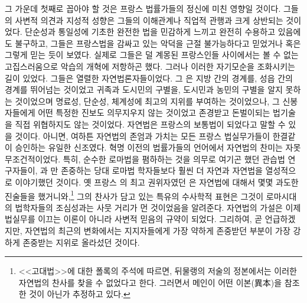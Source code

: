 그 가운데 첫째로 꼽아야 할 것은 프랑스 법률가들의 정신에 미친 영향일 것이다.
그들의 사변적 의견과 지성적 성향은 그들의 이해관계나 직업적 관행과
크게 상반되는 것이었다.
단순성과 통일성에 기초한 완전한 법을 민감하게 느끼고 완전히
수용하고 있음에도 불구하고,
그들은 프랑스법을 감싸고 있는 악덕을 근절 불가능하다고 믿었거나
혹은 그렇게 믿는 듯이 보였다.
실제로 그들은 덜 계몽된 프랑스인들 사이에서는 볼 수 없는 고집스러움으로
악습의 개혁에 저항하곤 했다.
그러나 이러한 자기모순을 조화시키는 길이 있었다.
그들은 열렬한 자연법론자들이었다.
그 은 지방 간의 경계를, 성읍 간의 경계를 뛰어넘는 것이었고
귀족과 도시민의 구별을, 도시민과 농민의 구별을
알지 못하는 것이었으며
명료성, 단순성, 체계성에 최고의 지위를 부여하는 것이었으나,
그 신봉자들에게 어떤 특정한 진보도 의무지우지 않는 것이었고
존경받고 돈벌이되는 법기술을 직접 위협하지도 않는 것이었다.
자연법은 프랑스의 보통법이 되었다고 말할 수 있을 것이다.
아니면, 여하튼 자연법의 존엄과 가치는
모든 프랑스 법실무가들이 한결같이 승인하는 유일한 신조였다.
혁명 이전의 법률가들의 언어에서 자연법의 찬미는 자못 무조건적이었다.
특히,
순수한 로마법을 폄하하는 것을 의무로 여기곤 했던
관습법 연구자들이,
과 만 존중하는 당대 로마법 학자들보다
훨씬 더 자연과 자연법을 열성적으로 이야기했던 것이다.
옛 프랑스 의 최고 권위자였던 은
자연법에 대해서 몇몇 과도한 진술들을 했거니와,\footnote{%
  <<고대법>>에 대한 폴록의 주석에 따르면,
  뒤물랭의 저술의 정본에서는 이러한 자연법의 찬사를 찾을 수 없었다고 한다.
  그러면서 메인이 어떤 이본(異本)을 참조한 것이 아닌가 추정하고 있다.}
그의 찬사가 담고 있는 특유의 수사학적 표현은
그것이 로마시대의 법학자들의 조심성과는 사뭇 거리가 먼 것이었음을 알려준다.
자연법의 가설은 이제 법실무를 이끄는 이론이 아니라
사변적 믿음의 규약이 되었다.
그리하여, 곧 언급하겠지만, 자연법의 최근의 변화에서는
지지자들에게 가장 약하게 존중받던 부분이 가장 강하게 존중받는 지위로
올라섰던 것이다.

